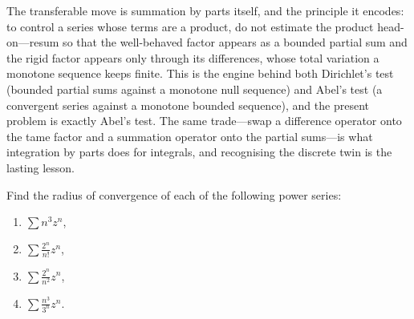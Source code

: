 \documentclass[main.tex]{subfiles}
\begin{document}
\begin{Reflection}
The transferable move is summation by parts itself, and the principle it encodes: to control a series
whose terms are a product, do not estimate the product head-on---resum so that the well-behaved factor
appears as a bounded partial sum and the rigid factor appears only through its differences, whose total
variation a monotone sequence keeps finite. This is the engine behind both Dirichlet's test (bounded
partial sums against a monotone null sequence) and Abel's test (a convergent series against a monotone
bounded sequence), and the present problem is exactly Abel's test. The same trade---swap a difference
operator onto the tame factor and a summation operator onto the partial sums---is what integration by
parts does for integrals, and recognising the discrete twin is the lasting lesson.
\end{Reflection}

Find the radius of convergence of each of the following power series:
\begin{enumerate}[leftmargin=1.7em,itemsep=2pt,topsep=2pt,label=\textnormal{(\alph*)}]
  \item $\displaystyle\sum n^{3} z^{n}$,
  \item $\displaystyle\sum \frac{2^{n}}{n!} z^{n}$,
  \item $\displaystyle\sum \frac{2^{n}}{n^{2}} z^{n}$,
  \item $\displaystyle\sum \frac{n^{3}}{3^{n}} z^{n}$.
\end{enumerate}
\end{document}
